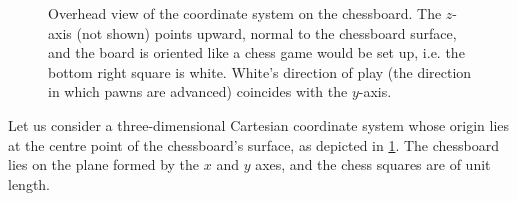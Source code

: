 \documentclass[../main.tex]{subfiles}
\begin{document}
\begin{figure}
    \centering
    \caption[The chessboard coordinate system.]{Overhead view of the coordinate system on the chessboard. The $z$-axis (not shown) points upward, normal to the chessboard surface, and the board is oriented like a chess game would be set up, i.e. the bottom right square is white. White's direction of play (the direction in which pawns are advanced) coincides with the $y$-axis.}
    \label{fig:cartesian_chessboard}
\end{figure}
Let us consider a three-dimensional Cartesian coordinate system whose origin lies at the centre point of the chessboard's surface, as depicted in \cref{fig:cartesian_chessboard}. 
The chessboard lies on the plane formed by the $x$ and $y$ axes, and the chess squares are of unit length. 
\end{document}
